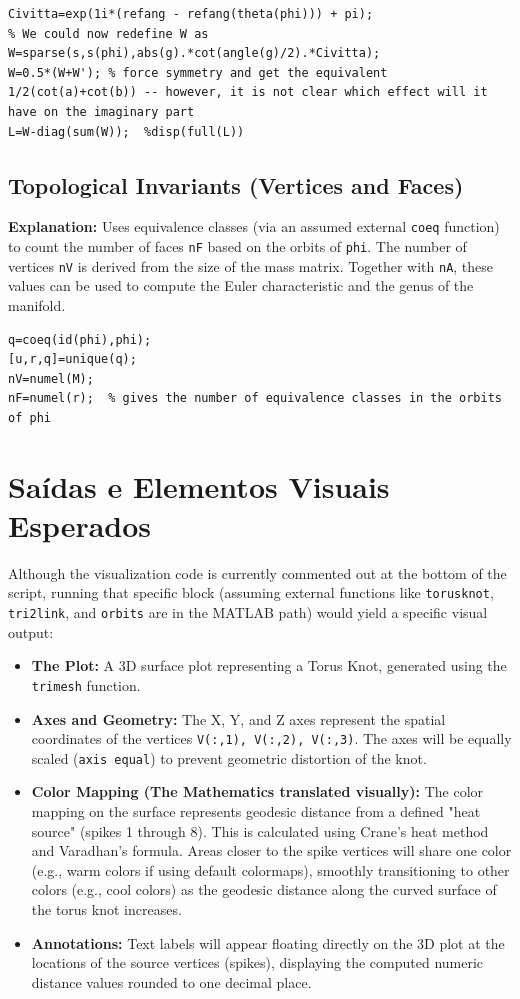 \begin{lstlisting}[style=matlab]
% The connection:
Civitta=exp(1i*(refang - refang(theta(phi))) + pi);
% We could now redefine W as
W=sparse(s,s(phi),abs(g).*cot(angle(g)/2).*Civitta);
W=0.5*(W+W'); % force symmetry and get the equivalent 1/2(cot(a)+cot(b)) -- however, it is not clear which effect will it have on the imaginary part
L=W-diag(sum(W));  %disp(full(L))
\end{lstlisting}

\subsection{Topological Invariants (Vertices and Faces)}
\textbf{Explanation:} Uses equivalence classes (via an assumed external \texttt{coeq} function) to count the number of faces \texttt{nF} based on the orbits of \texttt{phi}. The number of vertices \texttt{nV} is derived from the size of the mass matrix. Together with \texttt{nA}, these values can be used to compute the Euler characteristic and the genus of the manifold.

\begin{lstlisting}[style=matlab]
q=coeq(id(phi),phi);
[u,r,q]=unique(q);
nV=numel(M);
nF=numel(r);  % gives the number of equivalence classes in the orbits of phi
\end{lstlisting}

\section{Saídas e Elementos Visuais Esperados}

Although the visualization code is currently commented out at the bottom of the script, running that specific block (assuming external functions like \texttt{torusknot}, \texttt{tri2link}, and \texttt{orbits} are in the MATLAB path) would yield a specific visual output:

\begin{itemize}
    \item \textbf{The Plot:} A 3D surface plot representing a Torus Knot, generated using the \texttt{trimesh} function.
    \item \textbf{Axes and Geometry:} The X, Y, and Z axes represent the spatial coordinates of the vertices \texttt{V(:,1), V(:,2), V(:,3)}. The axes will be equally scaled (\texttt{axis equal}) to prevent geometric distortion of the knot.
    \item \textbf{Color Mapping (The Mathematics translated visually):} The color mapping on the surface represents geodesic distance from a defined "heat source" (spikes 1 through 8). This is calculated using Crane's heat method and Varadhan's formula. Areas closer to the spike vertices will share one color (e.g., warm colors if using default colormaps), smoothly transitioning to other colors (e.g., cool colors) as the geodesic distance along the curved surface of the torus knot increases.
    \item \textbf{Annotations:} Text labels will appear floating directly on the 3D plot at the locations of the source vertices (spikes), displaying the computed numeric distance values rounded to one decimal place.
\end{itemize}
